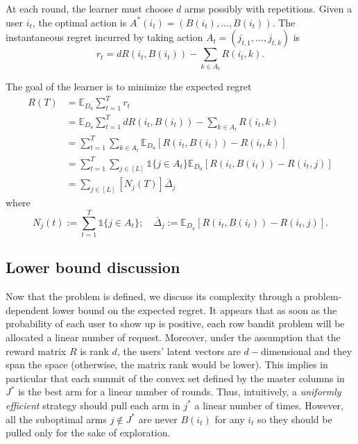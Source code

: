 At each round, the learner must choose $d$ arms possibly with repetitions.
Given a user $i_t$, the optimal action is $A^*(i_t)=(B(i_t),\ldots,B(i_t))$.
The instantaneous regret incurred by taking action $A_t= (j_{t,1},\ldots,j_{t,k})$
is
\[
r_t = d R(i_t,B(i_t)) - \sum_{k\in A_t} R(i_t,k).
\]

The goal of the learner is to minimize the expected regret
\begin{align*}
R(T) & = \mathds{E}_{D_u} \sum_{t=1}^T r_t\\
 & = \mathds{E}_{D_u} \sum_{t=1}^T d R(i_t,B(i_t)) - \sum_{k\in A_t} R(i_t,k)\\
 & = \sum_{t=1}^T \sum_{k\in A_t} \mathds{E}_{D_u} \left[ R(i_t,B(i_t)) - R(i_t,k) \right]\\
 & = \sum_{t=1}^T \sum_{j\in [L]}  \mathds{1}\{ j\in A_t \} \mathds{E}_{D_u} \left[ R(i_t,B(i_t)) - R(i_t,j)\right] \\
 & = \sum_{j\in [L]} [N_j(T)] \bar{\Delta}_j
\end{align*}
where
\[
N_j(t) := \sum_{t=1}^T \mathds{1}\{ j\in A_t \}; \quad \bar{\Delta}_j:=  \mathds{E}_{D_u}  \left[ R(i_t,B(i_t)) - R(i_t,j)\right].
\]


\subsection{Lower bound discussion}

Now that the problem is defined, we discuss its complexity through a problem-dependent lower bound on the expected regret.
It appears that as soon as the probability of each user to show up is positive,
each row bandit problem will be allocated a linear number of request.
Moreover, under the assumption that the reward matrix $R$ is rank $d$, the users' latent vectors
are $d-$dimensional and they span the space (otherwise, the matrix rank would be lower).
This implies in particular that each summit of the convex set defined by the master columns in $J^*$
is the best arm for a linear number of rounds.
Thus, intuitively, a \emph{uniformly efficient} strategy should pull each arm in $j^*$ a linear number of times.
However, all the suboptimal arms $j \notin J^*$ are never $B(i_t)$ for any $i_t$
so they should be pulled only for the sake of exploration.


